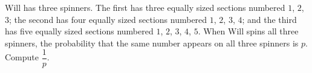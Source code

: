 Will has three spinners. The first has three equally sized sections numbered $1$, $2$, $3$; the second has four equally sized sections numbered $1$, $2$, $3$, $4$; and the third has five equally sized sections numbered $1$, $2$, $3$, $4$, $5$. When Will spins all three spinners, the probability that the same number appears on all three spinners is $p$. Compute $\dfrac{1}{p}$.
